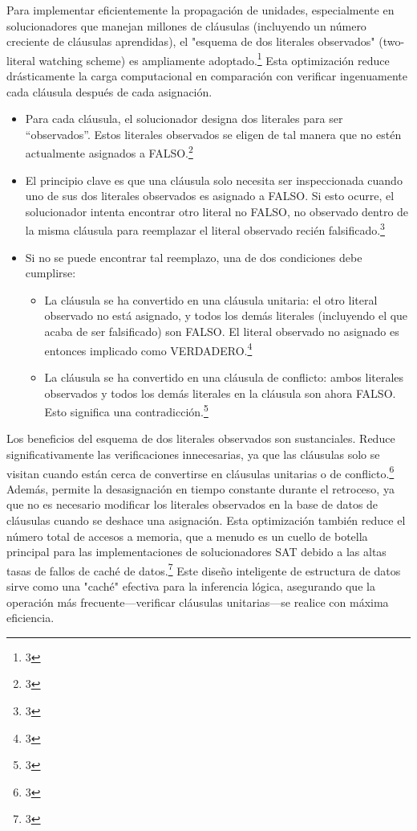 \documentclass{article}
\begin{document}
Para implementar eficientemente la propagación de unidades, especialmente en solucionadores que manejan millones de cláusulas (incluyendo un número creciente de cláusulas aprendidas), el "esquema de dos literales observados" (two-literal watching scheme) es ampliamente adoptado.\footnote{3} Esta optimización reduce drásticamente la carga computacional en comparación con verificar ingenuamente cada cláusula después de cada asignación.

\begin{itemize}
\item Para cada cláusula, el solucionador designa dos literales para ser ``observados''. Estos literales observados se eligen de tal manera que no estén actualmente asignados a FALSO.\footnote{3}

\item El principio clave es que una cláusula solo necesita ser inspeccionada cuando uno de sus dos literales observados es asignado a FALSO. Si esto ocurre, el solucionador intenta encontrar otro literal no FALSO, no observado dentro de la misma cláusula para reemplazar el literal observado recién falsificado.\footnote{3}

\item Si no se puede encontrar tal reemplazo, una de dos condiciones debe cumplirse:
\begin{itemize}
\item La cláusula se ha convertido en una cláusula unitaria: el otro literal observado no está asignado, y todos los demás literales (incluyendo el que acaba de ser falsificado) son FALSO. El literal observado no asignado es entonces implicado como VERDADERO.\footnote{3}
\item La cláusula se ha convertido en una cláusula de conflicto: ambos literales observados y todos los demás literales en la cláusula son ahora FALSO. Esto significa una contradicción.\footnote{3}
\end{itemize}
\end{itemize}

Los beneficios del esquema de dos literales observados son sustanciales. Reduce significativamente las verificaciones innecesarias, ya que las cláusulas solo se visitan cuando están cerca de convertirse en cláusulas unitarias o de conflicto.\footnote{3} Además, permite la desasignación en tiempo constante durante el retroceso, ya que no es necesario modificar los literales observados en la base de datos de cláusulas cuando se deshace una asignación. Esta optimización también reduce el número total de accesos a memoria, que a menudo es un cuello de botella principal para las implementaciones de solucionadores SAT debido a las altas tasas de fallos de caché de datos.\footnote{3} Este diseño inteligente de estructura de datos sirve como una "caché" efectiva para la inferencia lógica, asegurando que la operación más frecuente—verificar cláusulas unitarias—se realice con máxima eficiencia.
\end{document}
